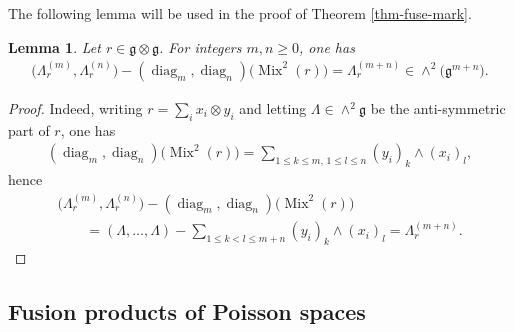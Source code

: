 \documentclass[pdftex]{sigma}
\numberwithin{equation}{section}
\newtheorem{Lemma}[Theorem]{Lemma}
\def \g {\mathfrak{a}}
\def \g {\mathfrak{g}}
\DeclareMathOperator{\diag}{diag}
\DeclareMathOperator{\Mix}{Mix}
\begin{document}
The following lemma will be used in the proof of Theorem \ref{thm-fuse-mark}.

\begin{Lemma} \label{lem-mix^2}
Let $r\in \g \otimes \g$. For integers $m,n \geq 0$, one has
\begin{gather*}
\big(\Lambda_r^{(m)}, \Lambda_r^{(n)}\big) - (\diag_m, \diag_n)\big(\Mix^2(r)\big) = \Lambda_r^{(m+n)} \in \wedge^2 \big(\g^{m+n}\big).
\end{gather*}
\end{Lemma}
\begin{proof}
Indeed, writing $r = \sum_i x_i \otimes y_i$ and letting $\Lambda \in \wedge^2 \g$ be the anti-symmetric part of $r$, one has
\begin{gather*}
(\diag_m, \diag_n)\big(\Mix^2(r)\big) = \sum_{1 \leq k \leq m, \, 1 \leq l \leq n} (y_i)_k \wedge (x_i)_l,
\end{gather*}
hence
\begin{gather*}
\big(\Lambda_r^{(m)}, \Lambda_r^{(n)}\big) - (\diag_m, \diag_n)\big(\Mix^2(r)\big) \\
\qquad{} = (\Lambda, \ldots, \Lambda) - \sum_{1 \leq k < l \leq m+n} (y_i)_k \wedge (x_i)_l = \Lambda_r^{(m+n)}.\tag*{\qed}
\end{gather*}\renewcommand{\qed}{}
\end{proof}

\subsection{Fusion products of Poisson spaces} \label{subsec-fusion}
\end{document}
